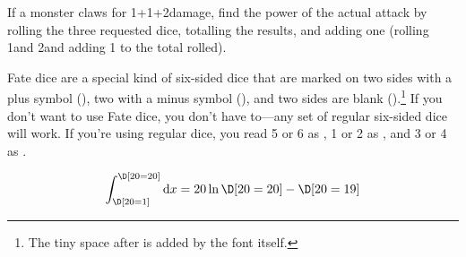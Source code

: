 \documentclass{article}
\begin{document}
If a monster claws for 1\D[6]+1+2\D[4] damage, find the power of the actual attack by rolling the three requested dice, totalling the results, and adding one (rolling 1\D[6] and 2\D[4] and adding 1 to the total rolled).

Fate dice are a special kind of six-sided dice that are marked on two sides with a plus symbol (\D[fd=+]), two with a minus symbol (\D[fd=-]), and two sides are blank (\D[fd=0]).\footnote{The tiny space after \FD[0] is added by the font itself.}
If you don't want to use Fate dice, you don't have to---any set of regular six-sided dice will work.
If you're using regular dice, you read 5 or 6 as \D[fds=+], 1 or 2 as \D[fds=-], and 3 or 4 as \D[fds=0].

\[
  \int_{\D[20=1]}^{\D[20=20]} \mathrm{d}x = 20 \ln \D[20=20] - \D[20=19]
\]
\end{document}
